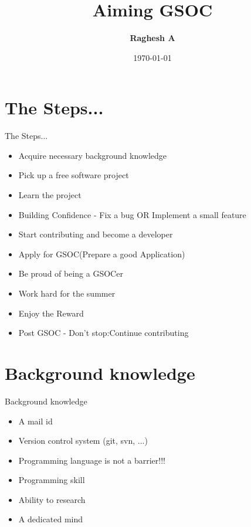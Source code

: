 \documentclass{beamer}
\title{Aiming GSOC}
\author{\textbf{Raghesh A}}
\date{\today}
\begin{document}
\begin{frame}
\titlepage
\end{frame}

\section[Outline]{}
\frame{\tableofcontents}

\section{The Steps...}
\begin{frame}{The Steps...}
\begin{itemize}
\item Acquire necessary background knowledge
\item Pick up a free software project
\item Learn the project
\item Building Confidence - Fix a bug OR Implement a small feature
\item Start contributing and become a developer
\item Apply for GSOC(Prepare a good Application)
\item Be proud of being a GSOCer
\item Work hard for the summer
\item Enjoy the Reward
\item Post GSOC - Don't stop:Continue contributing
\end{itemize}
\end{frame}

\section{Background knowledge}
\begin{frame}{Background knowledge}
\begin{itemize}
\item A mail id
\item Version control system (git, svn, ...)
\item Programming language is not a barrier!!!
\item Programming skill
\item Ability to research
\item A dedicated mind
\end{itemize}
\end{frame}
\end{document}
